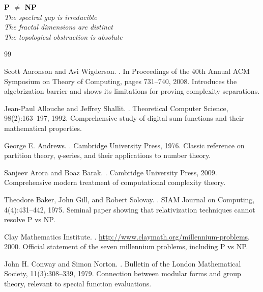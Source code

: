\documentclass[12pt]{article}
\theoremstyle{plain}
\theoremstyle{definition}
\begin{document}
\begin{center}
\large
\textbf{P $\neq$ NP}\\[0.5cm]
\textit{The spectral gap is irreducible}\\[0.5cm]
\textit{The fractal dimensions are distinct}\\[0.5cm]
\textit{The topological obstruction is absolute}
\end{center}
\pagebreak

\begin{thebibliography}{99}

Scott Aaronson and Avi Wigderson.
.
\newblock In Proceedings of the 40th Annual ACM Symposium on Theory of Computing, pages 731--740, 2008.
\newblock Introduces the algebrization barrier and shows its limitations for proving complexity separations.

Jean-Paul Allouche and Jeffrey Shallit.
.
\newblock Theoretical Computer Science, 98(2):163--197, 1992.
\newblock Comprehensive study of digital sum functions and their mathematical properties.

George E. Andrews.
.
\newblock Cambridge University Press, 1976.
\newblock Classic reference on partition theory, $q$-series, and their applications to number theory.

Sanjeev Arora and Boaz Barak.
.
\newblock Cambridge University Press, 2009.
\newblock Comprehensive modern treatment of computational complexity theory.

Theodore Baker, John Gill, and Robert Solovay.
.
\newblock SIAM Journal on Computing, 4(4):431--442, 1975.
\newblock Seminal paper showing that relativization techniques cannot resolve P vs NP.

Clay Mathematics Institute.
.
\newblock \url{http://www.claymath.org/millennium-problems}, 2000.
\newblock Official statement of the seven millennium problems, including P vs NP.

John H. Conway and Simon Norton.
.
\newblock Bulletin of the London Mathematical Society, 11(3):308--339, 1979.
\newblock Connection between modular forms and group theory, relevant to special function evaluations.


\end{thebibliography}
\end{document}
